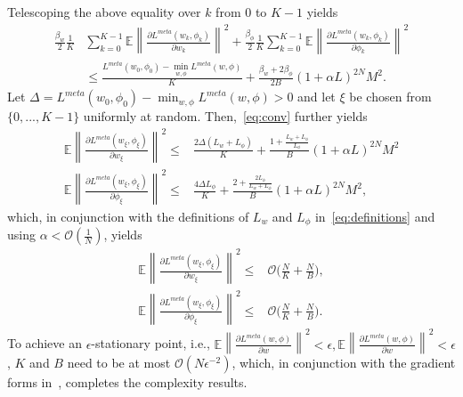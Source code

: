 \documentclass{osudissert96}
\begin{document}
Telescoping the above equality over $k$ from $0$ to $K-1$ yields
\begin{align}\label{eq:conv}
\frac{\beta_w}{2}\frac{1}{K}&\sum_{k=0}^{K-1}\mathbb{E}\left\| \frac{\partial L^{meta}(w_k,\phi_k)}{\partial w_k}\right\|^2 + \frac{\beta_\phi}{2}\frac{1}{K}\sum_{k=0}^{K-1}\mathbb{E}\left\| \frac{\partial L^{meta}(w_{k},\phi_k)}{\partial \phi_k}  \right\|^2 \nonumber
\\& \leq  \frac{L^{meta}(w_0,\phi_0)-\min_{w,\phi}L^{meta}(w,\phi) }{K}+ \frac{\beta_w+2\beta_\phi}{2B}(1+\alpha L)^{2N}M^2.
\end{align}
Let $\Delta = L^{meta}(w_0,\phi_0)-\min_{w,\phi}L^{meta}(w,\phi)>0$ and let $\xi$ be chosen from $\{0,...,K-1\}$ uniformly at random. Then,~\cref{eq:conv} further yields
\begin{align*}
\mathbb{E}\left\| \frac{\partial L^{meta}(w_\xi,\phi_\xi)}{\partial w_\xi}\right\|^2  \leq& \frac{2\Delta (L_w+L_\phi)}{K} + \frac{1+\frac{L_w+L_\phi}{L_\phi}}{B}(1+\alpha L)^{2N}M^2 \nonumber
\\\mathbb{E}\left\| \frac{\partial L^{meta}(w_\xi,\phi_\xi)}{\partial \phi_\xi}\right\|^2  \leq &\frac{4\Delta L_\phi}{K} + \frac{2+\frac{2L_\phi}{L_w+L_\phi}}{B}(1+\alpha L)^{2N}M^2,
\end{align*}
which, in conjunction with the definitions of $L_w$ and $L_\phi$ in~\cref{eq:definitions} and using $\alpha<\mathcal{O}(\frac{1}{N})$, yields %
\begin{align}
\mathbb{E}\left\| \frac{\partial L^{meta}(w_\xi,\phi_\xi)}{\partial w_\xi}\right\|^2  \leq& \mathcal{O}\bigg(  \frac{N}{K} + \frac{N}{B}  \bigg), \nonumber
\\\mathbb{E}\left\| \frac{\partial L^{meta}(w_\xi,\phi_\xi)}{\partial \phi_\xi}\right\|^2  \leq &\mathcal{O}\bigg(  \frac{N}{K} + \frac{N}{B}  \bigg).
\end{align}
To achieve an $\epsilon$-stationary point, i.e., {\small $\mathbb{E}\left\| \frac{\partial L^{meta}(w,\phi)}{\partial w}\right\|^2 <\epsilon,\mathbb{E}\left\| \frac{\partial L^{meta}(w,\phi)}{\partial w}\right\|^2 <\epsilon$}, $K$ and $B$ need to be at most $\mathcal{O}(N\epsilon^{-2})$, which, in conjunction with the gradient forms in~, completes  the complexity results.



%



\end{document}

